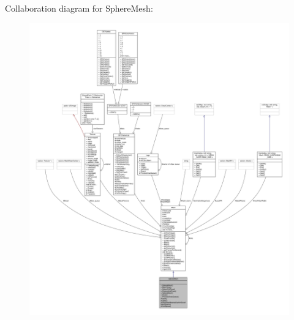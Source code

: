 Collaboration diagram for Sphere\+Mesh\+:
\nopagebreak
\begin{figure}[H]
\begin{center}
\leavevmode
\includegraphics[width=350pt]{d8/d7a/classSphereMesh__coll__graph}
\end{center}
\end{figure}
